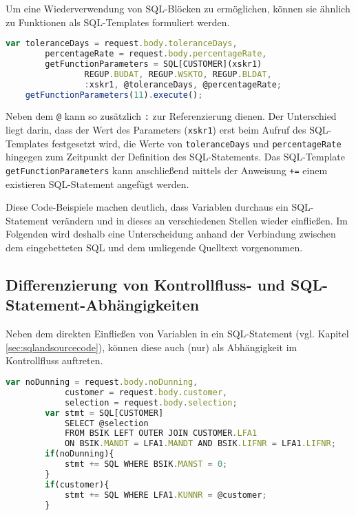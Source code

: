 Um eine Wiederverwendung von SQL-Blöcken zu ermöglichen, können sie ähnlich zu Funktionen als SQL-Templates \cite{Horschig2014} formuliert werden.

	\begin{lstlisting}[caption={SQL-Templates ermöglichen Wiederverwendung}, label={lst:sqlfunctions}, language=JavaScript]
	var toleranceDays = request.body.toleranceDays,
	    percentageRate = request.body.percentageRate,
	    getFunctionParameters = SQL[CUSTOMER](xskr1)
				REGUP.BUDAT, REGUP.WSKTO, REGUP.BLDAT,
				:xskr1, @toleranceDays, @percentageRate;
	getFunctionParameters(11).execute();
	\end{lstlisting}

Neben dem \texttt{@} kann so zusätzlich \texttt{:} zur Referenzierung dienen.
Der Unterschied liegt darin, dass der Wert des Parameters (\texttt{xskr1}) erst beim Aufruf des SQL-Templates festgesetzt wird, die Werte von \texttt{toleranceDays} und \texttt{percentageRate} hingegen zum Zeitpunkt der Definition des SQL-Statements.
Das SQL-Template \texttt{getFunctionParameters} kann anschließend mittels der Anweisung \texttt{+=} einem existieren SQL-Statement angefügt werden.

Diese Code-Beispiele machen deutlich, dass Variablen durchaus ein SQL-Statement verändern und in dieses an verschiedenen Stellen wieder einfließen.
Im Folgenden wird deshalb eine Unterscheidung anhand der Verbindung zwischen dem eingebetteten SQL und dem umliegende Quelltext vorgenommen.

\subsection{Differenzierung von Kontrollfluss- und SQL-Statement-Abhängigkeiten}
Neben dem direkten Einfließen von Variablen in ein SQL-Statement (vgl. Kapitel \ref{sec:sqlandsourcecode}), können diese auch (nur) als Abhängigkeit im Kontrollfluss auftreten.

	\begin{lstlisting}[caption={Verschiedene Arten von Abhängigkeiten der Variablen}, label={lst:differentdep}, language=JavaScript]
		var noDunning = request.body.noDunning,
		    customer = request.body.customer,
		    selection = request.body.selection;
		var stmt = SQL[CUSTOMER]
			SELECT @selection
			FROM BSIK LEFT OUTER JOIN CUSTOMER.LFA1
			ON BSIK.MANDT = LFA1.MANDT AND BSIK.LIFNR = LFA1.LIFNR;
		if(noDunning){
			stmt += SQL WHERE BSIK.MANST = 0;
		}
		if(customer){
			stmt += SQL WHERE LFA1.KUNNR = @customer;
		}
	\end{lstlisting}

